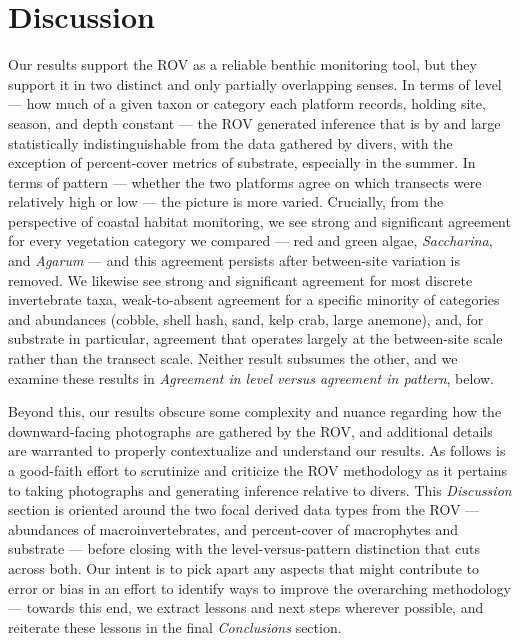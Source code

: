 \documentclass[11pt]{article}
\begin{document}
\section{Discussion}

Our results support the ROV as a reliable benthic monitoring tool, but they
support it in two distinct and only partially overlapping senses.
In terms of level --- how much of a given taxon or category each
platform records, holding site, season, and depth constant --- the ROV
generated inference that is by and large statistically indistinguishable from
the data gathered by divers, with the exception of percent-cover metrics of
substrate, especially in the summer.
In terms of pattern --- whether the two platforms agree on which
transects were relatively high or low --- the picture is more varied.
Crucially, from the perspective of coastal habitat monitoring, we see strong
and significant agreement for every vegetation category we compared --- red
and green algae, \textit{Saccharina}, and \textit{Agarum} --- and this
agreement persists after between-site variation is removed.
We likewise see strong and significant agreement for most discrete invertebrate 
taxa, weak-to-absent agreement for a specific minority of categories and 
abundances (cobble, shell hash, sand, kelp crab, large anemone), and, for 
substrate in particular, agreement that operates largely at the between-site 
scale rather than the transect scale.
Neither result subsumes the other, and we examine these results in 
\textit{Agreement in level versus agreement in pattern}, below.

Beyond this, our results obscure some complexity and nuance regarding how the
downward-facing photographs are gathered by the ROV, and additional details are
warranted to properly contextualize and understand our results.
As follows is a good-faith effort to scrutinize and criticize the ROV
methodology as it pertains to taking photographs and generating inference
relative to divers.
This \textit{Discussion} section is oriented around the two focal derived data
types from the ROV --- abundances of macroinvertebrates, and percent-cover of
macrophytes and substrate --- before closing with the level-versus-pattern
distinction that cuts across both.
Our intent is to pick apart any aspects that might contribute to error or bias
in an effort to identify ways to improve the overarching methodology ---
towards this end, we extract lessons and next steps wherever possible, and
reiterate these lessons in the final \textit{Conclusions} section.
\end{document}
